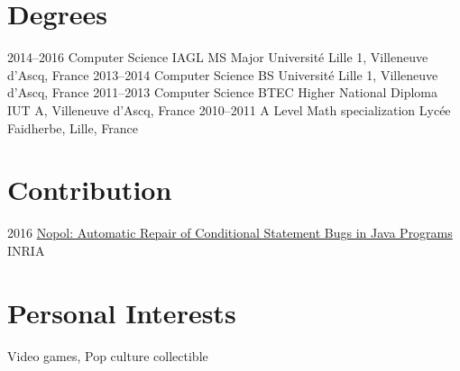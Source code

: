 \documentclass[hidelinks]{cv-style}          %
\begin{document}
\section{Degrees}
\begin{entrylist}

\entry
{2014--2016}
{Computer Science IAGL MS {\normalfont Major}}
{Université Lille 1, Villeneuve d'Ascq, France}
{\vspace{-0.3cm}}
\entry
{2013--2014}
{Computer Science BS}
{Université Lille 1, Villeneuve d'Ascq, France}
{\vspace{-0.3cm}}
\entry
{2011--2013}
{Computer Science BTEC Higher National Diploma}
{IUT A, Villeneuve d'Ascq, France}
{\vspace{-0.3cm}}
\entry
{2010--2011}
{A Level {\normalfont Math specialization}}
{Lycée Faidherbe, Lille, France}
{\vspace{-0.3cm}}

\end{entrylist}
\leavevmode
\section{Contribution}
\begin{entrylist}

\entry
{2016}
{\href{https://hal.archives-ouvertes.fr/hal-01285008}{Nopol: Automatic Repair of Conditional Statement Bugs in Java Programs}}
{INRIA}
{\vspace{-0.3cm}}

\end{entrylist}
\leavevmode


\section{Personal Interests}
\begin{entrylist}
\entry
{Video games, Pop culture collectible}
{}
{}
{\vspace{-0.3cm}}	
\end{entrylist}
\leavevmode
\end{document}
